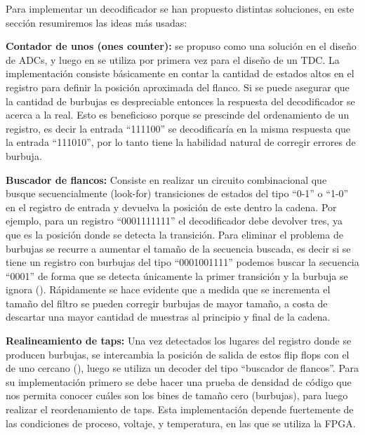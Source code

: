 Para implementar un decodificador se han propuesto distintas soluciones, en este sección resumiremos las ideas más usadas:
\begin{bangenumerate}
     \item \textbf{Contador de unos (ones counter):} se propuso como una solución en el diseño de ADCs, y luego en \cite{wang_39-ps_2017} se utiliza por primera vez
     para el diseño de un TDC. La implementación consiste básicamente en contar la cantidad de estados altos en el registro para definir la posición aproximada del flanco. 
     Si se puede asegurar que la cantidad de burbujas es despreciable entonces la respuesta del decodificador se acerca a la real. Esto es beneficioso porque 
     se prescinde del ordenamiento de un registro, es decir la entrada ``111100'' se decodificaría en la misma respuesta que la entrada ``111010'', por lo tanto
     tiene la habilidad natural de corregir errores de burbuja.

     \item \textbf{Buscador de flancos:} Consiste en realizar un circuito combinacional que busque secuencialmente (look-for) transiciones de estados del tipo ``0-1'' o ``1-0'' en el
     registro de entrada y devuelva la posición de este dentro la cadena. Por ejemplo, para un registro ``0001111111'' el decodificador debe devolver tres, ya que es la
     posición donde se detecta la transición. Para eliminar el problema de burbujas se recurre a aumentar el tamaño de la secuencia buscada,
     es decir si se tiene un registro con burbujas del tipo ``0001001111'' podemos buscar la secuencia ``0001'' de forma que se detecta únicamente la primer transición
     y la burbuja se ignora (\cite{Wu2010}). Rápidamente se hace evidente que a medida que se incrementa el tamaño del filtro se pueden corregir burbujas
     de mayor tamaño, a costa de descartar una mayor cantidad de muestras al principio y final de la cadena.
     
     
     \item \textbf{Realineamiento de taps:} Una vez detectados los lugares del registro donde se producen burbujas, se intercambia la posición de salida
     de estos flip flops con el de uno cercano (\cite{Liu2015}), luego se utiliza un decoder del tipo ``buscador de flancos''. Para su implementación primero
     se debe hacer una prueba de densidad de código que nos permita conocer cuáles son los bines de tamaño cero (burbujas), para luego realizar el reordenamiento de taps. Esta
     implementación depende fuertemente de las condiciones de proceso, voltaje, y temperatura, en las que se utiliza la FPGA.
\end{bangenumerate}

